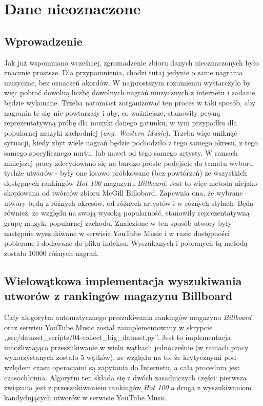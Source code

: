 \section{Dane nieoznaczone}

\subsection{Wprowadzenie}

Jak już wspomniano wcześniej, zgromadzenie zbioru danych nieoznaczonych było znacznie prostsze. Dla
przypomnienia, chodzi tutaj jedynie o same nagrania muzyczne, bez oznaczeń akordów. W najprostszym
rozumieniu wystarczyło by więc pobrać dowolną liczbę dowolnych nagrań muzycznych z internetu i
zadanie będzie wykonane. Trzeba natomiast zorganizować ten proces w taki sposób, aby nagrania te
się nie powtarzały i aby, co ważniejsze, stanowiły pewną reprezentatywną próbę dla muzyki danego
gatunku, w tym przypadku dla popularnej muzyki zachodniej (\emph{ang. Western Music}). Trzeba więc
uniknąć sytuacji, kiedy zbyt wiele nagrań będzie pochodziło z tego samego okresu, z tego samego
specyficznego nurtu, lub nawet od tego samego artysty. W ramach niniejszej pracy zdecydowano się na
bardzo proste podejście do tematu wyboru tychże utworów - były one losowo próbkowane (bez powtórzeń)
ze wszystkich dostępnych rankingów \emph{Hot 100} magazynu \emph{Billboard}. Jest to więc metoda
niejako skopiowana od twórców zbioru McGill Billobard. Zapewnia ona, że wybrane utwory będą z
różnych okresów, od różnych artystów i w różnych stylach. Będą również, ze względu na swoją wysoką
popularność, stanowiły reprezentatywną grupę muzyki popularnej zachodu. Znalezione w ten sposób
utwory były następnie wyszukiwane w serwisie YouTube Music i w razie dostępności pobierane i
dodawane do pliku indeksu. Wyszukanych i pobranych tą metodą zostało 10000 różnych nagrań.

\subsection{Wielowątkowa implementacja wyszukiwania utworów z rankingów magazynu Billboard}

Cały alogorytm automatycznego preszukiwania rankingów magazynu \emph{Billboard} oraz serwisu YouTube
Music został zaimplementowany w skrypcie ,,src/dataset\_scripts/04-collect\_big\_dataset.py''. Jest
to implementacja umożliwiająca przeszukiwanie w wielu wątkach jednocześnie (w ramach pracy
wykorzystanych zostało 5 wątków), ze względu na to, że krytycznymi pod wzlędem czasu operacjami są
zapytania do Internetu, a cała procedura jest czasochłonna. Algorytm ten składa się z dwóch
zasadniczych części: pierwsza związana jest z przeszukiwaniem rankingów \emph{Hot 100} a druga z
wyszukiwaniem kandydujących utworów w serwisie YouTube Music.

